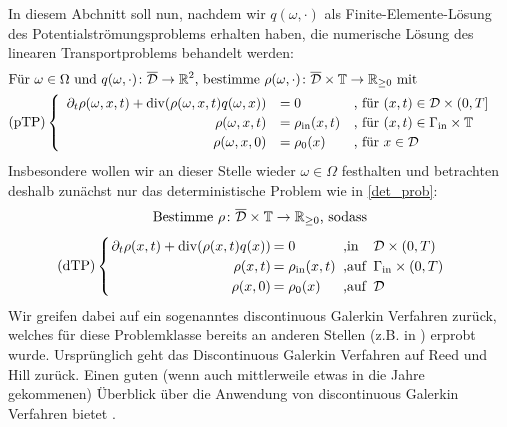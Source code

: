  \label{DG}
In diesem Abchnitt soll nun, nachdem wir $q(\omega,\cdot)$ als Finite-Elemente-Lösung des Potentialströmungsproblems erhalten haben, die numerische Lösung des linearen Transportproblems behandelt werden:
\begin{align*}
	&\text{Für } \omega \in \Omega \text{ und }q(\omega,\cdot)\colon \overline{\mathcal{D}} \to \mathbb{R}^2 \text{, bestimme }\rho(\omega,\cdot)\colon \overline{\mathcal{D}} \times \mathbb{T} \to \mathbb{R}_{\geq 0} \text{ mit} \\
	&\text{(pTP)} 
	\begin{cases}
	\begin{array}{rlll}
	\partial_t \rho (\omega, x, t) + \operatorname{div}(\rho(\omega,x,t)q(\omega,x)) &= 0 &\text{, für } (x,t) \in \mathcal{D} \times (0,T] \\
	\rho(\omega,x,t) &= \rho_{\text{in}}(x,t) &\text{, für } (x,t) \in \Gamma_{\text{in}} \times \mathbb{T} \\
	\rho(\omega,x,0)  &= \rho_0(x) &\text{, für } x \in  \mathcal{D}
	\end{array}
	\end{cases} \\
\end{align*}
Insbesondere wollen wir an dieser Stelle wieder $\omega \in \Omega$ festhalten und betrachten deshalb zunächst nur das deterministische Problem wie in \ref{det_prob}:
\[ 
\text{Bestimme } \rho \colon \overline{\mathcal{D}} \times \mathbb{T} \to \R_{\geq 0} \text{, sodass} \newline \]
\[\setlength\arraycolsep{1pt}
\text{(dTP)}\begin{cases} 
\begin{array}{rlll}
\partial_t \rho(x,t) + \dive(\rho(x,t) q(x)) &= 0 &\text{ ,in } &\mathcal{D} \times (0,T)\\
\rho(x,t) &= \rho_{\text{in}}(x,t) &\text{ ,auf } &\Gamma_{\text{in}} \times (0,T)\\
\rho(x,0) &= \rho_0(x) &\text{ ,auf } &\mathcal{D} \\
\end{array}
\end{cases} \\
\]
 Wir greifen dabei auf ein sogenanntes discontinuous Galerkin Verfahren zurück, welches für diese Problemklasse bereits an anderen Stellen (z.B. in \cite{cockburn1998runge}) erprobt wurde. Ursprünglich geht das Discontinuous Galerkin Verfahren auf Reed und Hill \cite{reed1973triangular} zurück. Einen guten (wenn auch mittlerweile etwas in die Jahre gekommenen) Überblick über die Anwendung von discontinuous Galerkin Verfahren bietet \cite{cockburn2000development}.
